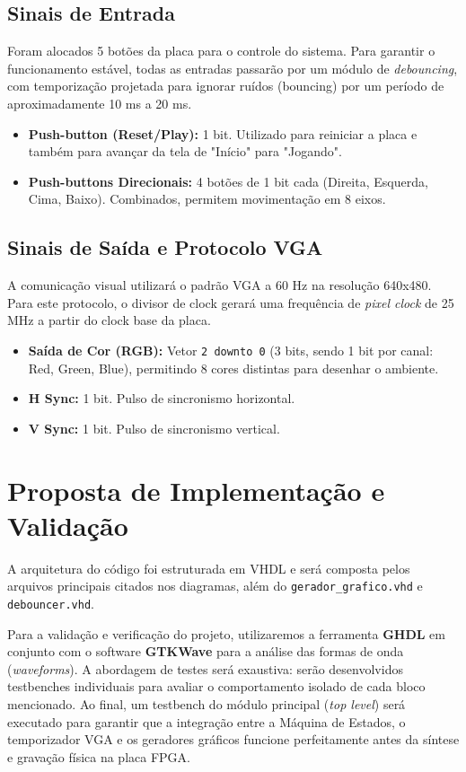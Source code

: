 \documentclass[11pt, a4paper]{article}
\begin{document}
\subsection{Sinais de Entrada}
Foram alocados 5 botões da placa para o controle do sistema. Para garantir o funcionamento estável, todas as entradas passarão por um módulo de \textit{debouncing}, com temporização projetada para ignorar ruídos (bouncing) por um período de aproximadamente 10 ms a 20 ms.
\begin{itemize}
    \item \textbf{Push-button (Reset/Play):} 1 bit. Utilizado para reiniciar a placa e também para avançar da tela de "Início" para "Jogando".
    \item \textbf{Push-buttons Direcionais:} 4 botões de 1 bit cada (Direita, Esquerda, Cima, Baixo). Combinados, permitem movimentação em 8 eixos.
\end{itemize}

\subsection{Sinais de Saída e Protocolo VGA}
A comunicação visual utilizará o padrão VGA a 60 Hz na resolução 640x480. Para este protocolo, o divisor de clock gerará uma frequência de \textit{pixel clock} de 25 MHz a partir do clock base da placa.
\begin{itemize}
    \item \textbf{Saída de Cor (RGB):} Vetor \texttt{2 downto 0} (3 bits, sendo 1 bit por canal: Red, Green, Blue), permitindo 8 cores distintas para desenhar o ambiente.
    \item \textbf{H Sync:} 1 bit. Pulso de sincronismo horizontal.
    \item \textbf{V Sync:} 1 bit. Pulso de sincronismo vertical.
\end{itemize}

\section{Proposta de Implementação e Validação}
A arquitetura do código foi estruturada em VHDL e será composta pelos arquivos principais citados nos diagramas, além do \texttt{gerador\_grafico.vhd} e \texttt{debouncer.vhd}.

Para a validação e verificação do projeto, utilizaremos a ferramenta \textbf{GHDL} em conjunto com o software \textbf{GTKWave} para a análise das formas de onda (\textit{waveforms}). A abordagem de testes será exaustiva: serão desenvolvidos testbenches individuais para avaliar o comportamento isolado de cada bloco mencionado. Ao final, um testbench do módulo principal (\textit{top level}) será executado para garantir que a integração entre a Máquina de Estados, o temporizador VGA e os geradores gráficos funcione perfeitamente antes da síntese e gravação física na placa FPGA.
\end{document}

